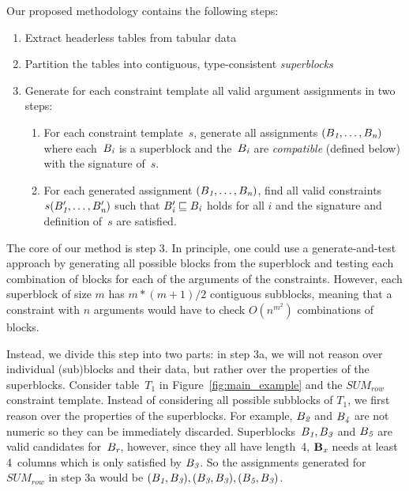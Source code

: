 Our proposed methodology contains the following steps:
\begin{enumerate}
\item Extract headerless tables from tabular data
\item Partition the tables into contiguous, type-consistent \textit{superblocks}
\item Generate for each constraint template all valid argument assignments in two steps:
\begin{enumerate}
\item For each constraint template~$s$, generate all assignments $(B_{\textit{1}}, \ldots ,B_{\textit{n}})$ where each~$B_{\textit{i}}$ is a superblock and the~$B_{\textit{i}}$ are \textit{compatible} (defined below) with the signature of~$s$. 
\item For each generated assignment $(B_{\textit{1}}, \ldots ,B_{\textit{n}})$, find all valid constraints $s(B'_{\textit{1}}, \ldots, B'_{\textit{n}})$ such that $B'_{\textit{i}} \sqsubseteq B_{\textit{i}}$ holds for all $i$ and the signature and definition of~$s$ are satisfied.
\end{enumerate}
\end{enumerate}

The core of our method is step 3. In principle, one could use a generate-and-test approach by generating all possible blocks from the superblock and testing each combination of blocks for each of the arguments of the constraints. However, each superblock of size $m$ has $m*(m+1)/2$ contiguous subblocks, meaning that a constraint with $n$ arguments would have to check $O(n^{m^2})$ combinations of blocks.

Instead, we divide this step into two parts: in step 3a, we will not reason over individual (sub)blocks and their data, but rather over the properties of the superblocks.
Consider table~$T_1$ in Figure~\ref{fig:main_example} and the $\textit{SUM}_{row}$ constraint template.
Instead of considering all possible subblocks of $T_1$, we first reason over the properties of the superblocks.
For example, $B_{\textit{2}}$ and $B_{\textit{4}}$ are not numeric so they can be immediately discarded.
Superblocks~$B_{\textit{1}}, B_{\textit{3}}$ and $B_{\textit{5}}$ are valid candidates for~$B_{\textit{r}}$, however, since they all have length~4, $\mathbf{B_{\textit{x}}}$ needs at least 4~columns which is only satisfied by $B_{\textit{3}}$.
So the assignments generated for $\textit{SUM}_{row}$ in step 3a would be $(B_{\textit{1}}, B_{\textit{3}}), (B_{\textit{3}}, B_{\textit{3}}), (B_{\textit{5}}, B_{\textit{3}})$.


